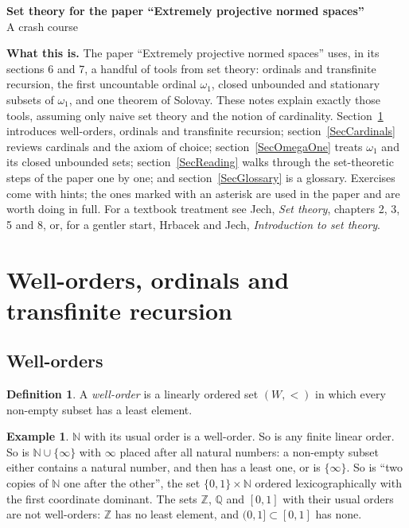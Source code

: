 \documentclass[12pt]{article}
\theoremstyle{definition}
\newtheorem{definition}[theorem]{Definition}
\newtheorem{example}[theorem]{Example}
\theoremstyle{remark}
\newcommand{\NN}{\mathbb{N}}
\begin{document}
\begin{center}
    \Large \textbf{Set theory for the paper ``Extremely projective normed spaces''}\\[0.3cm]
    \large A crash course\\[0.5cm]
\end{center}

\thispagestyle{empty}

\medskip
\noindent\textbf{What this is.} The paper ``Extremely projective normed
spaces'' uses, in its sections 6 and 7, a handful of tools from set theory:
ordinals and transfinite recursion, the first uncountable ordinal $\omega_1$,
closed unbounded and stationary subsets of $\omega_1$, and one theorem of
Solovay. These notes explain exactly those tools, assuming only naive set
theory and the notion of cardinality. Section~\ref{SecOrdinals} introduces
well-orders, ordinals and transfinite recursion; section~\ref{SecCardinals}
reviews cardinals and the axiom of choice; section~\ref{SecOmegaOne} treats
$\omega_1$ and its closed unbounded sets; section~\ref{SecReading} walks
through the set-theoretic steps of the paper one by one; and
section~\ref{SecGlossary} is a glossary. Exercises come with hints; the ones
marked with an asterisk are used in the paper and are worth doing in full.
For a textbook treatment see Jech, \emph{Set theory}, chapters 2, 3, 5 and 8,
or, for a gentler start, Hrbacek and Jech, \emph{Introduction to set theory}.
\medskip

\section{Well-orders, ordinals and transfinite recursion}\label{SecOrdinals}

\subsection{Well-orders}

\begin{definition} A \emph{well-order} is a linearly ordered set $(W,<)$ in
    which every non-empty subset has a least element.
\end{definition}

\begin{example} $\NN$ with its usual order is a well-order. So is any finite
    linear order. So is $\NN\cup\{\infty\}$ with $\infty$ placed after all
    natural numbers: a non-empty subset either contains a natural number, and
    then has a least one, or is $\{\infty\}$. So is ``two copies of $\NN$ one
    after the other'', the set $\{0,1\}\times\NN$ ordered lexicographically
    with the first coordinate dominant. The sets $\mathbb{Z}$, $\mathbb{Q}$ and
    $[0,1]$ with their usual orders are not well-orders: $\mathbb{Z}$ has no
    least element, and $(0,1]\subset[0,1]$ has none.
\end{example}
\end{document}
